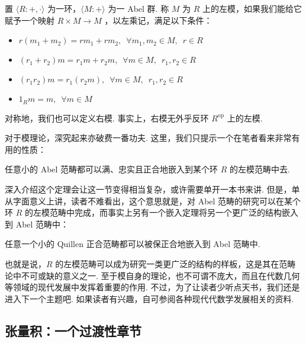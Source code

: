 \begin{definition}
    置 $\langle R : +, \cdot \rangle$ 为一环，$\langle M : + \rangle$ 为一 Abel 群. 称 $M$ 为 $R$ 上的左模，如果我们能给它赋予一个映射 $R \times M \to M$ ，以左乘记，满足以下条件：

    \begin{itemize}
        \item $r(m_1 + m_2) = rm_1 + rm_2,\enspace \forall m_1, m_2 \in M,\enspace r \in R$

        \item $(r_1 + r_2)m = r_1m + r_2m,\enspace \forall m \in M,\enspace r_1, r_2 \in R$

        \item $(r_1r_2)m = r_1(r_2m),\enspace \forall m \in M,\enspace r_1, r_2 \in R$

        \item $1_Rm = m,\enspace \forall m \in M$
    \end{itemize}

    对称地，我们也可以定义右模. 事实上，右模无外乎反环 $R^{\mathrm{op}}$ 上的左模.
\end{definition}

对于模理论，深究起来亦破费一番功夫. 这里，我们只提示一个在笔者看来非常有用的性质：

\begin{theorem}
    任意小的 Abel 范畴都可以满、忠实且正合地嵌入到某个环 $R$ 的左模范畴中去.
\end{theorem}

深入介绍这个定理会让这一节变得相当复杂，或许需要单开一本书来讲. 但是，单从字面意义上讲，读者不难看出，这个意思就是，对 Abel 范畴的研究可以在某个环 $R$ 的左模范畴中完成，而事实上另有一个嵌入定理将另一个更广泛的结构嵌入到 Abel 范畴中：

\begin{theorem}
    任意一个小的 Quillen 正合范畴都可以被保正合地嵌入到 Abel 范畴中.
\end{theorem}

也就是说，$R$ 的左模范畴可以成为研究一类更广泛的结构的样板，这是其在范畴论中不可或缺的意义之一. 至于模自身的理论，也不可谓不庞大，而且在代数几何等领域的现代发展中发挥着重要的作用. 不过，为了让读者少听点天书，我们还是进入下一个主题吧. 如果读者有兴趣，自可参阅各种现代代数学发展相关的资料.

\subsection{张量积：一个过渡性章节}

